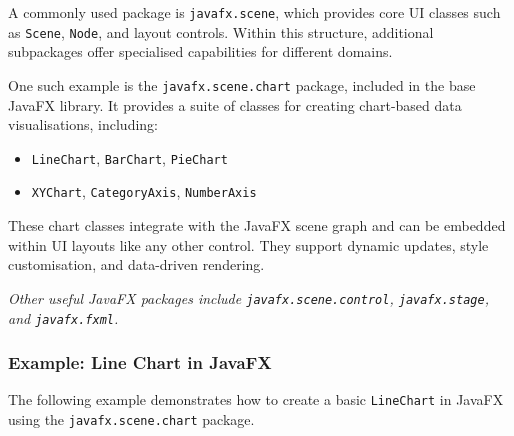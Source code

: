 \documentclass{article}
\newcommand{\codecmd}[1]{\textcolor[rgb]{0,0.5,0}{\texttt{#1}}}
\begin{document}
A commonly used package is \codecmd{javafx.scene}, which provides core UI classes such as \codecmd{Scene}, \codecmd{Node}, and layout controls. Within this structure, additional subpackages offer specialised capabilities for different domains.

One such example is the \codecmd{javafx.scene.chart} package, included in the base JavaFX library. It provides a suite of classes for creating chart-based data visualisations, including:

\begin{itemize}
    \item \codecmd{LineChart}, \codecmd{BarChart}, \codecmd{PieChart}
    \item \codecmd{XYChart}, \codecmd{CategoryAxis}, \codecmd{NumberAxis}
\end{itemize}

These chart classes integrate with the JavaFX scene graph and can be embedded within UI layouts like any other control. They support dynamic updates, style customisation, and data-driven rendering.

\medskip
\textit{Other useful JavaFX packages include \codecmd{javafx.scene.control}, \codecmd{javafx.stage}, and \codecmd{javafx.fxml}.}

\subsubsection{Example: Line Chart in JavaFX}

The following example demonstrates how to create a basic \codecmd{LineChart} in JavaFX using the \codecmd{javafx.scene.chart} package.
\end{document}
